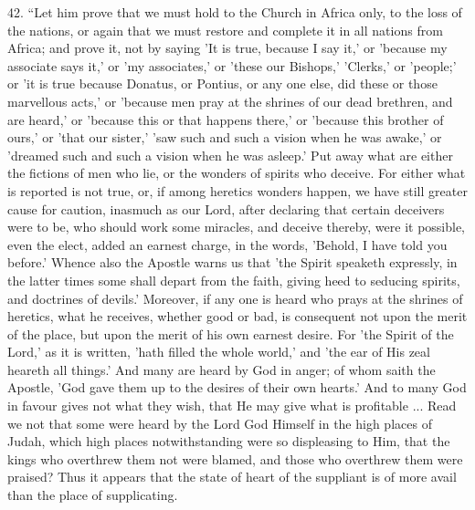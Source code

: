 42. ``Let
him prove that we must hold to the Church in Africa only, to the loss
of the nations, or again that we must restore and complete it in all
nations from Africa; and prove it, not by saying 'It is true, because
I say it,' or 'because my associate says it,' or 'my
associates,' or 'these our Bishops,' 'Clerks,' or 'people;' or 'it is
true because Donatus, or Pontius, or any one else, did these or those
marvellous acts,' or 'because men pray at the shrines of our dead
brethren, and are heard,' or 'because this or that happens there,' or
'because this brother of ours,' or 'that our sister,' 'saw such and
such a vision when he was awake,' or 'dreamed such and such a vision
when he was asleep.' Put away what are either the fictions of men who
lie, or the wonders of spirits who deceive. For either what is
reported is not true, or, if among heretics wonders happen, we have
still greater cause for caution, inasmuch as our Lord, after declaring
that certain deceivers were to be, who should work some miracles, and
deceive thereby, were it possible, even the elect, added an earnest
charge, in the words, 'Behold, I have told you before.' Whence also
the Apostle warns us that 'the Spirit speaketh expressly, in the
latter times some shall depart from the faith, giving heed to seducing
spirits, and doctrines of devils.' Moreover, if any one is heard who
prays at the shrines of heretics, what he receives, whether good or
bad, is consequent not upon the merit of the place, but upon the merit
of his own earnest desire. For 'the Spirit of the Lord,' as it is
written, 'hath filled the whole world,' and 'the ear of His zeal
heareth all things.' And many are heard by God in anger; of whom saith
the Apostle, 'God gave them up to the desires of their own
hearts.' And to many God in favour gives not what they wish, that He
may give what is profitable ... Read we not that some were heard by
the Lord God Himself in the high places of Judah, which high places
notwithstanding were so displeasing to Him, that the kings who
overthrew them not were blamed, and those who overthrew them were
praised? Thus it appears that the state of heart of the suppliant is
of more avail than the place of supplicating.

